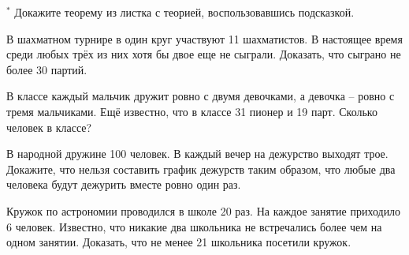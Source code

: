 \begin{thm} $^*$
    Докажите теорему из листка с теорией, воспользовавшись подсказкой.
\end{thm}

\begin{thm}
    В шахматном турнире в один круг участвуют 11 шахматистов. В настоящее время среди любых трёх из них хотя бы двое еще не сыграли. Доказать, что сыграно не более 30 партий.
\end{thm}

\begin{thm}
В классе каждый мальчик дружит ровно с двумя девочками, а девочка -- ровно с тремя мальчиками. Ещё известно, что в классе 31 пионер и 19 парт. Сколько человек в классе?
\end{thm}

\begin{thm}
    В народной дружине 100 человек. В каждый вечер на дежурство выходят трое. Докажите, что нельзя составить график дежурств таким образом, что любые два человека будут дежурить вместе ровно один раз.
\end{thm}

\begin{thm}
    Кружок по астрономии проводился в школе 20 раз. На каждое занятие приходило 6 человек. Известно, что никакие два школьника не встречались более чем на одном занятии. Доказать, что не менее 21 школьника посетили кружок.
\end{thm}

